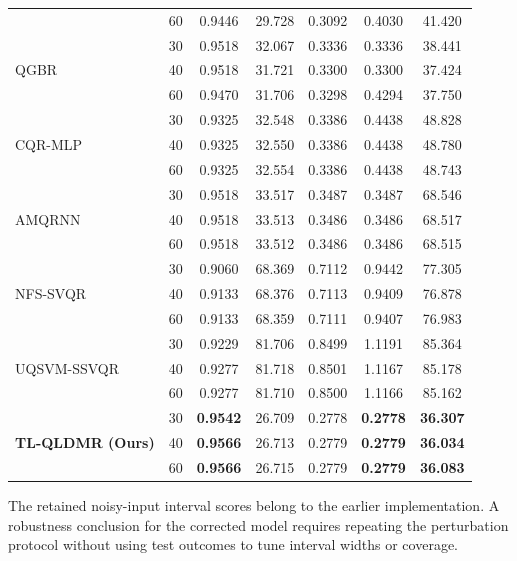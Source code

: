 \begin{table}[ht]
\begin{tabular}{llccccc}
  & 60 & 0.9446 & 29.728 & 0.3092 & 0.4030 & 41.420 \\
\multirow{3}{*}{QGBR}
  & 30 & 0.9518 & 32.067 & 0.3336 & 0.3336 & 38.441 \\
  & 40 & 0.9518 & 31.721 & 0.3300 & 0.3300 & 37.424 \\
  & 60 & 0.9470 & 31.706 & 0.3298 & 0.4294 & 37.750 \\
\multirow{3}{*}{CQR-MLP}
  & 30 & 0.9325 & 32.548 & 0.3386 & 0.4438 & 48.828 \\
  & 40 & 0.9325 & 32.550 & 0.3386 & 0.4438 & 48.780 \\
  & 60 & 0.9325 & 32.554 & 0.3386 & 0.4438 & 48.743 \\
\multirow{3}{*}{AMQRNN}
  & 30 & 0.9518 & 33.517 & 0.3487 & 0.3487 & 68.546 \\
  & 40 & 0.9518 & 33.513 & 0.3486 & 0.3486 & 68.517 \\
  & 60 & 0.9518 & 33.512 & 0.3486 & 0.3486 & 68.515 \\
\multirow{3}{*}{NFS-SVQR}
  & 30 & 0.9060 & 68.369 & 0.7112 & 0.9442 & 77.305 \\
  & 40 & 0.9133 & 68.376 & 0.7113 & 0.9409 & 76.878 \\
  & 60 & 0.9133 & 68.359 & 0.7111 & 0.9407 & 76.983 \\
\multirow{3}{*}{UQSVM-SSVQR}
  & 30 & 0.9229 & 81.706 & 0.8499 & 1.1191 & 85.364 \\
  & 40 & 0.9277 & 81.718 & 0.8501 & 1.1167 & 85.178 \\
  & 60 & 0.9277 & 81.710 & 0.8500 & 1.1166 & 85.162 \\
\multirow{3}{*}{\textbf{TL-QLDMR (Ours)}}
  & 30 & \textbf{0.9542} & 26.709 & 0.2778 & \textbf{0.2778} & \textbf{36.307} \\
  & 40 & \textbf{0.9566} & 26.713 & 0.2779 & \textbf{0.2779} & \textbf{36.034} \\
  & 60 & \textbf{0.9566} & 26.715 & 0.2779 & \textbf{0.2779} & \textbf{36.083} \\
\bottomrule
\end{tabular}
\label{tab:exp3_noise}
\end{table}

{\color{blue}The retained noisy-input interval scores belong to the earlier implementation. A robustness conclusion for the corrected model requires repeating the perturbation protocol without using test outcomes to tune interval widths or coverage.}



